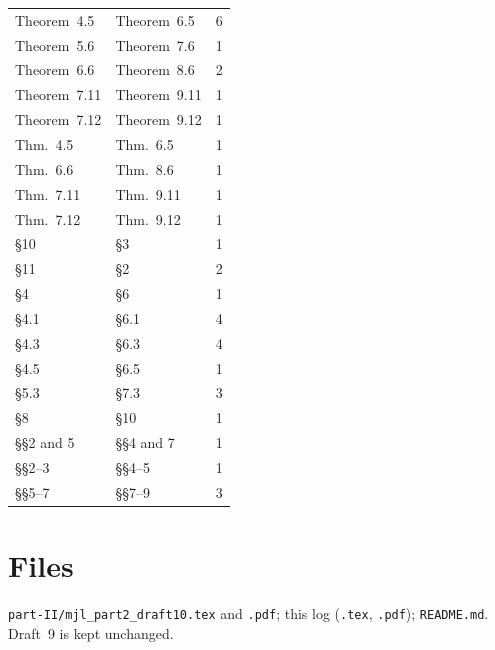 \documentclass[11pt]{article}
\begin{document}
\begin{longtable}{@{}lll@{}}
Theorem~4.5 & Theorem~6.5 & 6\\
Theorem~5.6 & Theorem~7.6 & 1\\
Theorem~6.6 & Theorem~8.6 & 2\\
Theorem~7.11 & Theorem~9.11 & 1\\
Theorem~7.12 & Theorem~9.12 & 1\\
Thm.~4.5 & Thm.~6.5 & 1\\
Thm.~6.6 & Thm.~8.6 & 1\\
Thm.~7.11 & Thm.~9.11 & 1\\
Thm.~7.12 & Thm.~9.12 & 1\\
\S 10 & \S 3 & 1\\
\S 11 & \S 2 & 2\\
\S 4 & \S 6 & 1\\
\S 4.1 & \S 6.1 & 4\\
\S 4.3 & \S 6.3 & 4\\
\S 4.5 & \S 6.5 & 1\\
\S 5.3 & \S 7.3 & 3\\
\S 8 & \S 10 & 1\\
\S \S 2 and 5 & \S \S 4 and 7 & 1\\
\S \S 2--3 & \S \S 4--5 & 1\\
\S \S 5--7 & \S \S 7--9 & 3\\
\bottomrule\end{longtable}

\section*{Files}
\texttt{part-II/mjl\_part2\_draft10.tex} and \texttt{.pdf}; this log
(\texttt{.tex}, \texttt{.pdf}); \texttt{README.md}.  Draft~9 is kept
unchanged.
\end{document}
